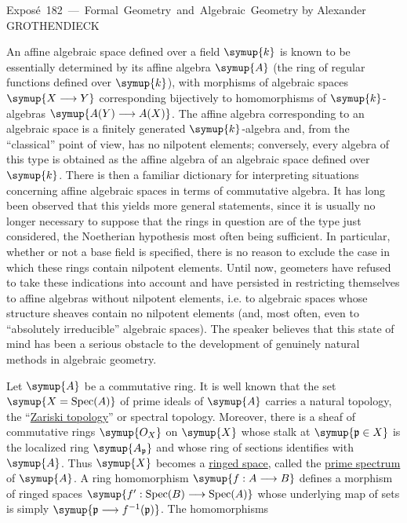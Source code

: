 \unit{Exposé 182 — Formal Geometry and Algebraic Geometry}
%
  {by Alexander GROTHENDIECK}


An affine algebraic space defined over a field $\symup{k}$ is known to be essentially
determined by its affine algebra $\symup{A}$ (the ring of regular functions defined over
$\symup{k}$), with morphisms of algebraic spaces $\symup{X\longrightarrow Y}$ corresponding
bijectively to homomorphisms of $\symup{k}$-algebras
$\symup{A(Y)\longrightarrow A(X)}$. The affine algebra corresponding to an algebraic
space is a finitely generated $\symup{k}$-algebra and, from the “classical” point of
view, has no nilpotent elements; conversely, every algebra of this type is
obtained as the affine algebra of an algebraic space defined over $\symup{k}$. There is
then a familiar dictionary for interpreting situations concerning affine
algebraic spaces in terms of commutative algebra. It has long been observed
that this yields more general statements, since it is usually no longer
necessary to suppose that the rings in question are of the type just
considered, the Noetherian hypothesis most often being sufficient. In
particular, whether or not a base field is specified, there is no reason to
exclude the case in which these rings contain nilpotent elements. Until now,
geometers have refused to take these indications into account and have
persisted in restricting themselves to affine algebras without nilpotent
elements, i.e. to algebraic spaces whose structure sheaves contain no
nilpotent elements (and, most often, even to “absolutely irreducible”
algebraic spaces). The speaker believes that this state of mind has been a
serious obstacle to the development of genuinely natural methods in algebraic
geometry.

Let $\symup{A}$ be a commutative ring. It is well known that the set
$\symup{X=\operatorname{Spec}(A)}$ of prime ideals of $\symup{A}$ carries a natural topology,
the “\uline{Zariski topology}” or spectral topology. Moreover, there is a sheaf of
commutative rings $\symup{O_X}$ on $\symup{X}$ whose stalk at $\symup{\mathfrak p\in X}$ is the
localized ring $\symup{A_{\mathfrak p}}$ and whose ring of sections identifies with
$\symup{A}$. Thus $\symup{X}$ becomes a \uline{ringed space}, called the \uline{prime spectrum}
of $\symup{A}$. A ring homomorphism $\symup{f:A\longrightarrow B}$ defines a morphism of
ringed spaces
$\symup{f':\operatorname{Spec}(B)\longrightarrow\operatorname{Spec}(A)}$ whose
underlying map of sets is simply
$\symup{\mathfrak p\longrightarrow f^{-1}(\mathfrak p)}$. The homomorphisms

